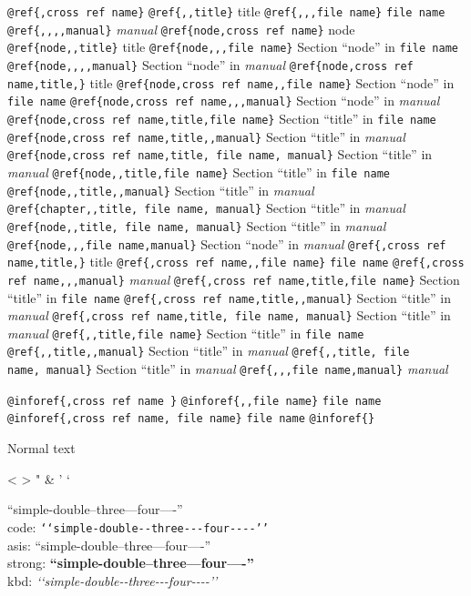 \documentclass{book}
\newcommand\GNUTexinfocommandstyletextkbd[1]{{\ttfamily\textsl{#1}}}%
\begin{document}
\texttt{@ref\{,cross ref name\}} 
\texttt{@ref\{{,}{,}title\}} title
\texttt{@ref\{{,}{,},file name\}} \texttt{file name}
\texttt{@ref\{{,}{,}{,}{,}manual\}} \textsl{manual}
\texttt{@ref\{node,cross ref name\}} node
\texttt{@ref\{node{,}{,}title\}} title
\texttt{@ref\{node{,}{,},file name\}} Section ``node'' in \texttt{file name}
\texttt{@ref\{node{,}{,}{,}{,}manual\}} Section ``node'' in \textsl{manual}
\texttt{@ref\{node,cross ref name,title,\}} title
\texttt{@ref\{node,cross ref name{,}{,}file name\}} Section ``node'' in \texttt{file name}
\texttt{@ref\{node,cross ref name{,}{,},manual\}} Section ``node'' in \textsl{manual}
\texttt{@ref\{node,cross ref name,title,file name\}} Section ``title'' in \texttt{file name}
\texttt{@ref\{node,cross ref name,title{,}{,}manual\}} Section ``title'' in \textsl{manual}
\texttt{@ref\{node,cross ref name,title,\ file name,\ manual\}} Section ``title'' in \textsl{manual}
\texttt{@ref\{node{,}{,}title,file name\}} Section ``title'' in \texttt{file name}
\texttt{@ref\{node{,}{,}title{,}{,}manual\}} Section ``title'' in \textsl{manual}
\texttt{@ref\{chapter{,}{,}title,\ file name,\ manual\}} Section ``title'' in \textsl{manual}
\texttt{@ref\{node{,}{,}title,\ file name,\ manual\}} Section ``title'' in \textsl{manual}
\texttt{@ref\{node{,}{,},file name,manual\}} Section ``node'' in \textsl{manual}
\texttt{@ref\{,cross ref name,title,\}} title
\texttt{@ref\{,cross ref name{,}{,}file name\}} \texttt{file name}
\texttt{@ref\{,cross ref name{,}{,},manual\}} \textsl{manual}
\texttt{@ref\{,cross ref name,title,file name\}} Section ``title'' in \texttt{file name}
\texttt{@ref\{,cross ref name,title{,}{,}manual\}} Section ``title'' in \textsl{manual}
\texttt{@ref\{,cross ref name,title,\ file name,\ manual\}} Section ``title'' in \textsl{manual}
\texttt{@ref\{{,}{,}title,file name\}} Section ``title'' in \texttt{file name}
\texttt{@ref\{{,}{,}title{,}{,}manual\}} Section ``title'' in \textsl{manual}
\texttt{@ref\{{,}{,}title,\ file name,\ manual\}} Section ``title'' in \textsl{manual}
\texttt{@ref\{{,}{,},file name,manual\}} \textsl{manual}

\texttt{@inforef\{,cross ref name \}} 
\texttt{@inforef\{{,}{,}file name\}} \texttt{file name}
\texttt{@inforef\{,cross ref name,\ file name\}} \texttt{file name}
\texttt{@inforef\{\}} 



Normal text

<
>
"
\&
'
`

``simple-double--three---four----''\leavevmode{}\\
code: \texttt{{`}{`}simple-double{-}{-}three{-}{-}{-}four{-}{-}{-}-{'}{'}} \leavevmode{}\\
asis: ``simple-double--three---four----'' \leavevmode{}\\
strong: \textbf{``simple-double--three---four----''} \leavevmode{}\\
kbd: \GNUTexinfocommandstyletextkbd{{`}{`}simple-double{-}{-}three{-}{-}{-}four{-}{-}{-}-{'}{'}} \leavevmode{}\\
\end{document}
